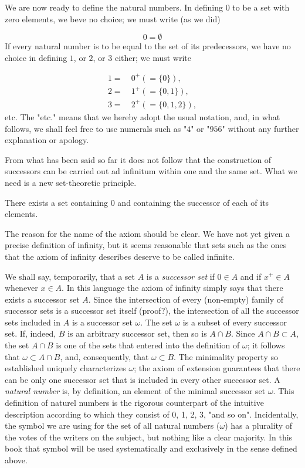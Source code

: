 We are now ready to define the natural numbers. In defining $0$ to be a set with zero elements, we beve no choice; we must write (as we did) 

\begin{equation*}
0 = \emptyset
\end{equation*}
If every natural number is to be equal to the set of its predecessors, we have no choice in defining $1$, or $2$, or $3$ either; we must write

\begin{align*}
1 =& \: 0^{+}(= \{ 0 \} ), \\
2 =& \: 1^{+}(= \{ 0, 1 \} ), \\
3 =& \: 2^{+}(= \{ 0, 1, 2 \} ),
\end{align*}
etc. The "etc." means that we hereby adopt the usual notation, and, in what follows, we shall feel free to use numerals such as "$4$" or "$956$" without any further explanation or apology. 

From what has been said so far it does not follow that the construction of successors can be carried out ad infinitum within one and the same set. What we need is a new set-theoretic principle. 

\begin{named} There exists a set containing $0$ and containing the successor of each of its elements.
\end{named} 

The reason for the name of the axiom should be clear. We have not yet given a precise definition of infinity, but it seems reasonable that sets such as the ones that the axiom of infinity describes deserve to be called infinite.

We shall say, temporarily, that a set $A$ is a \textit{successor set} if $0 \in A$ and if $x^{+} \in A$ whenever $x \in A$. In this language the axiom of infinity simply says that there exists a successor set $A$. Since the intersection of every (non-empty) family of successor sets is a successor set itself (proof?), the intersection of all the successor sets included in $A$ is a successor set $ \omega $. The set $ \omega $ is a subset of every successor set. If, indeed, $B$ is an arbitrary successor set, then so is $A \cap B$. Since $ A \cap B \subset A$, the set $A \cap B$ is one of the sets that entered into the definition of $ \omega $; it follows that $ \omega \subset A \cap B$, and, consequently, that $\omega  \subset B$. The minimality property so established uniquely characterizes $ \omega $; the axiom of extension guarantees that there can be only one successor set that is included in every other successor set. A \textit{natural number} is, by definition, an element of the minimal successor set $ \omega$. This definition of naturel numbers is the rigorous counterpart of the intuitive description according to which they consist of 0, 1, 2, 3, "and so on". Incidentally, the symbol we are using for the set of all natural numbers ($ \omega $) has a plurality of the votes of the writers on the subject, but nothing like a clear majority. In this book that symbol will be used systematically and exclusively in the sense defined above.


